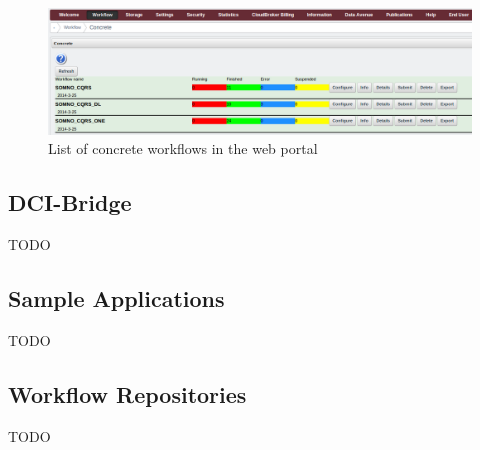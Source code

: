 \begin{figure}%
                \centering
                \includegraphics[width=2.0\columnwidth]{images/interface-workflows.png}
                \caption{List of concrete workflows in the web portal}
                \label{fig:interfaceworkflows}
\end{figure}


\subsection{DCI-Bridge}\label{dci}

TODO

\subsection{Sample Applications}\label{applications}

TODO

\subsection{Workflow Repositories}\label{repositories}

TODO
